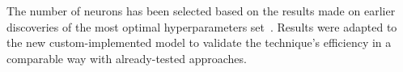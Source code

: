 {The number of neurons has been selected based on the results made on earlier discoveries of the most optimal hyperparameters set~\cite{sadykov_practical_2022}.
Results were adapted to the new custom-implemented model to validate the technique's efficiency in a comparable way with already-tested approaches.
\begin{table}[ht]
    \renewcommand{\arraystretch}{1.3}
    \caption{Model structure and parameters}
    \centering
    \label{tab:params}
\end{table}
}

